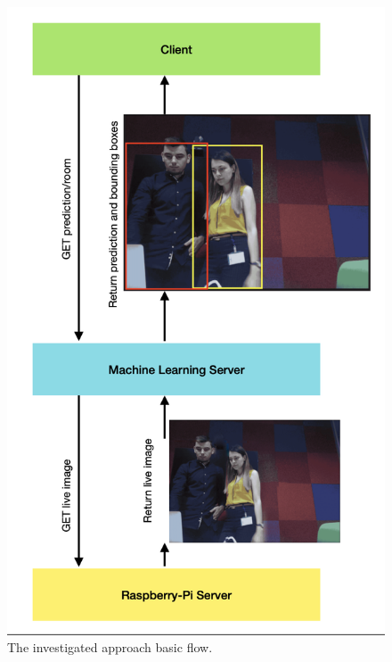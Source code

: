 \documentclass[runningheads,a4paper,11pt]{report}
\begin{document}
\begin{figure}[H]
	\centerline{\includegraphics[scale=0.45]{Flow-diagram.png}}  
	\caption{The investigated approach basic flow.}
	\label{Flow-diagram}
\end{figure}
\end{document}
